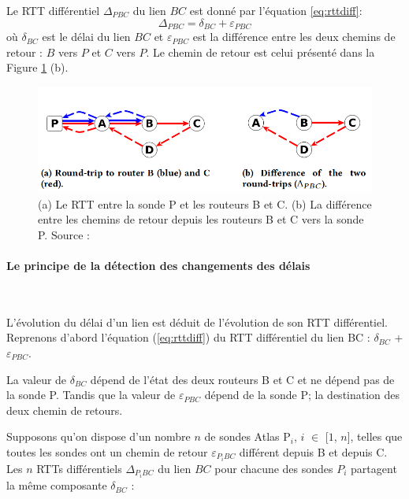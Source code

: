 Le RTT différentiel $ \Delta_{PBC} $ du lien $ BC $ est  donné par l'équation \ref{eq:rttdiff}:
\begin{equation}
\Delta_{PBC} = \delta_{BC} + \varepsilon_{PBC}
\label{eq:rttdiff}
\end{equation}
où $\delta_{BC}$ est le délai du lien $BC$ et $\varepsilon_{PBC}$ est la différence entre les deux chemins de retour : $B$ vers $P$ et $C$ vers $P$.  Le chemin de retour est celui  présenté dans  la Figure \ref{fig:rtt-differ} (b). 
\begin{figure}[H]
	\centering
		\captionsetup{justification= centering}
	\includegraphics[width=0.7\linewidth]{illustrations/rtt-differ}
	\caption{(a) Le RTT entre la sonde P et les routeurs B et C. (b) La différence entre les  chemins de retour depuis les routeurs B et C vers la sonde P. Source : \cite{DBLP:journals/corr/FontugneAPB16}}
	\label{fig:rtt-differ}
\end{figure}

\paragraph{Le principe de la détection des changements des délais}~

L'évolution du délai d'un lien est déduit de l'évolution de son RTT différentiel. Reprenons d'abord l'équation (\ref{eq:rttdiff}) du RTT différentiel du lien BC :   $\delta_{BC}$ + $\varepsilon_{PBC}$. 
 
La valeur de  $\delta_{BC}$ dépend de l'état des deux routeurs B et C et ne dépend pas de la sonde P. Tandis que la valeur de $\varepsilon_{PBC}$ dépend de la sonde P; la destination des deux chemin de retours.
 
 Supposons qu'on dispose d'un nombre $n$ de sondes Atlas P$_i$, $i$ $\in$ [$1$, $n$], telles que toutes les sondes ont un chemin de retour  $\varepsilon_{P_{i}BC}$ différent depuis B et depuis C.  Les $n$ RTTs différentiels $\Delta_{P{_i}BC}$ du lien $BC$ pour chacune des sondes $P_i$  partagent la même composante $\delta_{BC}$ :
 
